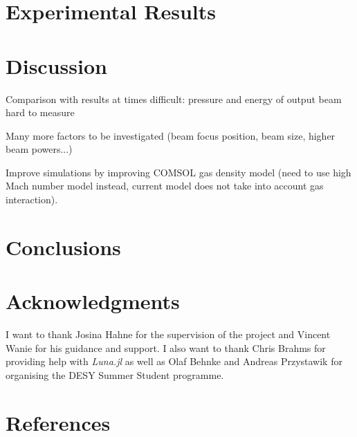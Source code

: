 \documentclass[a4paper]{jpconf}
\begin{document}


\section{Experimental Results}

\section{Discussion}
Comparison with results at times difficult: pressure and energy of output beam hard to measure


Many more factors to be investigated (beam focus position, beam size, higher beam powers...)


Improve simulations by improving COMSOL gas density model (need to use high Mach number model instead, current model does not take into account gas interaction). 

\section{Conclusions}

\section*{Acknowledgments}
I want to thank Josina Hahne for the supervision of the project and Vincent Wanie for his guidance and support. I also want to thank Chris Brahms for providing help with \textit{Luna.jl} as well as Olaf Behnke and Andreas Przystawik for organising the DESY Summer Student programme.  


\section*{References}


\end{document}
